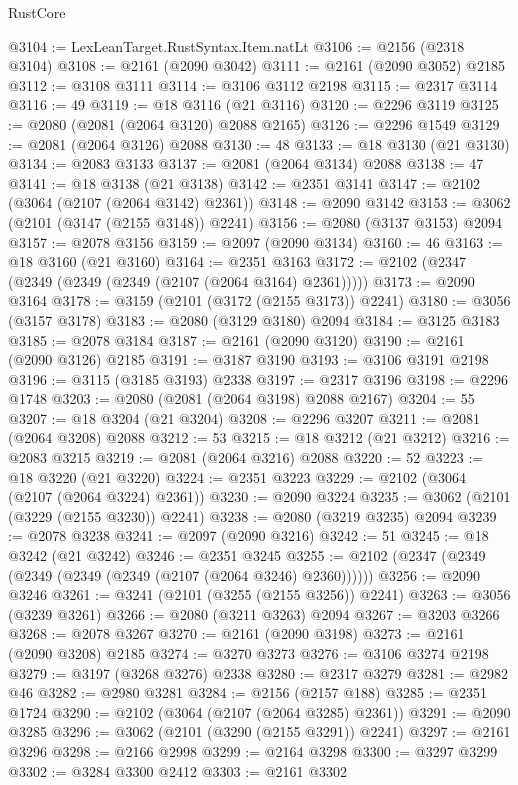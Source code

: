 \begin{lexlean}{RustCore}
\begin{coremodule}
@3104 := LexLeanTarget.RustSyntax.Item.natLt
@3106 := @2156 (@2318 @3104)
@3108 := @2161 (@2090 @3042)
@3111 := @2161 (@2090 @3052) @2185
@3112 := @3108 @3111
@3114 := @3106 @3112 @2198
@3115 := @2317 @3114
@3116 := 49
@3119 := @18 @3116 (@21 @3116)
@3120 := @2296 @3119
@3125 := @2080 (@2081 (@2064 @3120) @2088 @2165)
@3126 := @2296 @1549
@3129 := @2081 (@2064 @3126) @2088
@3130 := 48
@3133 := @18 @3130 (@21 @3130)
@3134 := @2083 @3133
@3137 := @2081 (@2064 @3134) @2088
@3138 := 47
@3141 := @18 @3138 (@21 @3138)
@3142 := @2351 @3141
@3147 := @2102 (@3064 (@2107 (@2064 @3142) @2361))
@3148 := @2090 @3142
@3153 := @3062 (@2101 (@3147 (@2155 @3148)) @2241)
@3156 := @2080 (@3137 @3153) @2094
@3157 := @2078 @3156
@3159 := @2097 (@2090 @3134)
@3160 := 46
@3163 := @18 @3160 (@21 @3160)
@3164 := @2351 @3163
@3172 := @2102 (@2347 (@2349 (@2349 (@2349 (@2107 (@2064 @3164) @2361)))))
@3173 := @2090 @3164
@3178 := @3159 (@2101 (@3172 (@2155 @3173)) @2241)
@3180 := @3056 (@3157 @3178)
@3183 := @2080 (@3129 @3180) @2094
@3184 := @3125 @3183
@3185 := @2078 @3184
@3187 := @2161 (@2090 @3120)
@3190 := @2161 (@2090 @3126) @2185
@3191 := @3187 @3190
@3193 := @3106 @3191 @2198
@3196 := @3115 (@3185 @3193) @2338
@3197 := @2317 @3196
@3198 := @2296 @1748
@3203 := @2080 (@2081 (@2064 @3198) @2088 @2167)
@3204 := 55
@3207 := @18 @3204 (@21 @3204)
@3208 := @2296 @3207
@3211 := @2081 (@2064 @3208) @2088
@3212 := 53
@3215 := @18 @3212 (@21 @3212)
@3216 := @2083 @3215
@3219 := @2081 (@2064 @3216) @2088
@3220 := 52
@3223 := @18 @3220 (@21 @3220)
@3224 := @2351 @3223
@3229 := @2102 (@3064 (@2107 (@2064 @3224) @2361))
@3230 := @2090 @3224
@3235 := @3062 (@2101 (@3229 (@2155 @3230)) @2241)
@3238 := @2080 (@3219 @3235) @2094
@3239 := @2078 @3238
@3241 := @2097 (@2090 @3216)
@3242 := 51
@3245 := @18 @3242 (@21 @3242)
@3246 := @2351 @3245
@3255 := @2102 (@2347 (@2349 (@2349 (@2349 (@2349 (@2107 (@2064 @3246) @2360))))))
@3256 := @2090 @3246
@3261 := @3241 (@2101 (@3255 (@2155 @3256)) @2241)
@3263 := @3056 (@3239 @3261)
@3266 := @2080 (@3211 @3263) @2094
@3267 := @3203 @3266
@3268 := @2078 @3267
@3270 := @2161 (@2090 @3198)
@3273 := @2161 (@2090 @3208) @2185
@3274 := @3270 @3273
@3276 := @3106 @3274 @2198
@3279 := @3197 (@3268 @3276) @2338
@3280 := @2317 @3279
@3281 := @2982 @46
@3282 := @2980 @3281
@3284 := @2156 (@2157 @188)
@3285 := @2351 @1724
@3290 := @2102 (@3064 (@2107 (@2064 @3285) @2361))
@3291 := @2090 @3285
@3296 := @3062 (@2101 (@3290 (@2155 @3291)) @2241)
@3297 := @2161 @3296
@3298 := @2166 @2998
@3299 := @2164 @3298
@3300 := @3297 @3299
@3302 := @3284 @3300 @2412
@3303 := @2161 @3302

\end{coremodule}
\end{lexlean}
